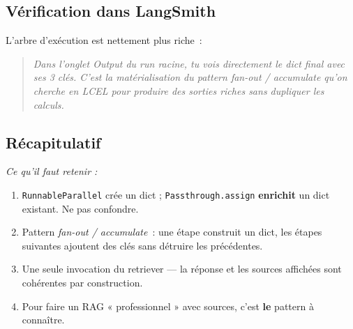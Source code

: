 \documentclass[11pt,a4paper]{article}
\begin{document}
\subsection{Vérification dans LangSmith}

L'arbre d'exécution est nettement plus riche~:

\begin{center}
\end{center}

\begin{quote}\itshape
Dans l'onglet \emph{Output} du run racine, tu vois directement le dict
final avec ses 3 clés. C'est la matérialisation du pattern \emph{fan-out
/ accumulate} qu'on cherche en LCEL pour produire des sorties riches
sans dupliquer les calculs.
\end{quote}

\subsection*{Récapitulatif}
{\itshape\sloppy
\textit{Ce qu'il faut retenir :}
\begin{enumerate}[leftmargin=*]
  \item \texttt{RunnableParallel} crée un dict ; \texttt{Passthrough.assign}
        \textbf{enrichit} un dict existant. Ne pas confondre.
  \item Pattern \emph{fan-out / accumulate}~: une étape construit un
        dict, les étapes suivantes ajoutent des clés sans détruire les
        précédentes.
  \item Une seule invocation du retriever — la réponse et les sources
        affichées sont cohérentes par construction.
  \item Pour faire un RAG « professionnel » avec sources, c'est
        \textbf{le} pattern à connaître.
\end{enumerate}
\par}
\end{document}
